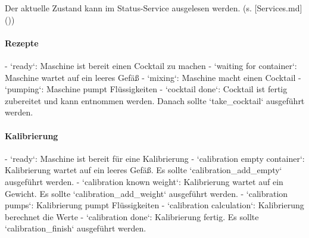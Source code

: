 {	Der aktuelle Zustand kann im Status-Service ausgelesen werden. (s. [Services.md]())
	
	\paragraph{ Rezepte}
	
	- `ready`: Maschine ist bereit einen Cocktail zu machen
	- `waiting for container`: Maschine wartet auf ein leeres Gefäß
	- `mixing`: Maschine macht einen Cocktail
	- `pumping`: Maschine pumpt Flüssigkeiten
	- `cocktail done`: Cocktail ist fertig zubereitet und kann entnommen werden. Danach sollte `take\_cocktail` ausgeführt werden.
	
	\paragraph{ Kalibrierung}
	
	- `ready`: Maschine ist bereit für eine Kalibrierung
	- `calibration empty container`: Kalibrierung wartet auf ein leeres Gefäß. Es sollte `calibration\_add\_empty` ausgeführt werden.
	- `calibration known weight`: Kalibrierung wartet auf ein Gewicht. Es sollte `calibration\_add\_weight` ausgeführt werden.
	- `calibration pumps`: Kalibrierung pumpt Flüssigkeiten
	- `calibration calculation`: Kalibrierung berechnet die Werte
	- `calibration done`: Kalibrierung fertig. Es sollte `calibration\_finish` ausgeführt werden.

}
